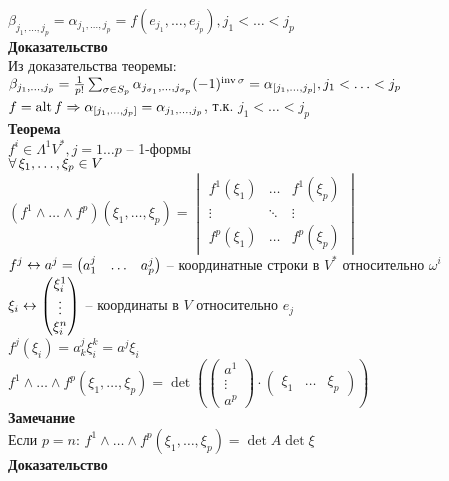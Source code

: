\documentclass[12pt]{article}
\begin{document}
$\beta_{j_1,\ldots,j_p} = \alpha_{j_1,\ldots,j_p} = f(e_{j_1}, \ldots, e_{j_p}), j_1 < \ldots < j_p$\\
\textbf{Доказательство}\\
Из доказательства теоремы:\\
$\beta_{j_1,\ldots,j_p} = \frac1{p!}\sum_{\sigma \in S_p} \alpha_{j_{\sigma_1},\ldots,j_{\sigma_p}}(-1)^{\operatorname{inv} \sigma} = \alpha_{[j_1,\ldots,j_p]}, j_1<\ldots<j_p$\\
$f = \operatorname{alt} f \Rightarrow \alpha_{[j_1, \ldots,j_p]} = \alpha_{j_1,\ldots,j_p}$, т.к. $j_1<\ldots<j_p$\\
\textbf{Теорема}\\
$f^i \in \Lambda^1 V^*, j = 1\ldots p$ -- 1-формы\\
$\forall\, \xi_1,\ldots,\xi_p \in V$\\
$(f^1 \land \ldots \land f^p)(\xi_1,\ldots,\xi_p) = \begin{vmatrix}
    f^1(\xi_1) & \ldots & f^1(\xi_p)\\
    \vdots & \ddots & \vdots\\
    f^p(\xi_1) & \ldots & f^p(\xi_p)
\end{vmatrix}$\\
$f^j \leftrightarrow a^j = \begin{pmatrix}
    a_1^j & \ldots & a_p^j
\end{pmatrix}$ -- координатные строки в $V^*$ относительно $\omega^i$\\
$\xi_i \leftrightarrow \begin{pmatrix}
    \xi_i^1\\
    \vdots\\
    \xi_i^n
\end{pmatrix}$ -- координаты в $V$ относительно $e_j$\\
$f^j(\xi_i) = a_k^j \xi_i^k = a^j\xi_i$\\
$f^1 \land \ldots \land f^p(\xi_1,\ldots,\xi_p) = \det(\begin{pmatrix}
    a^1\\
    \vdots\\
    a^p
\end{pmatrix} \cdot \begin{pmatrix}
    \xi_1 & \ldots & \xi_p
\end{pmatrix})$\\
\textbf{Замечание}\\
Если $p=n$: $f^1 \land \ldots \land f^p(\xi_1,\ldots,\xi_p)=\det A \det \xi$\\
\textbf{Доказательство}\\
\end{document}
